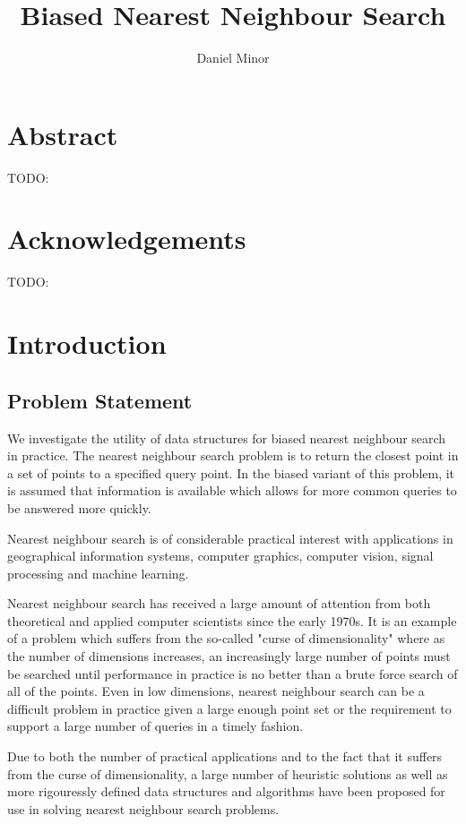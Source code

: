 \documentclass[mcs]{scsthesis}
\title {Biased Nearest Neighbour Search}
\author {Daniel Minor}
\begin{document}
\newtheorem*{thm}{Theorem}[section]

\beforepreface

\prefacesection

\chapter*{Abstract}

TODO:

\chapter*{Acknowledgements}

TODO:

\afterpreface

\chapter{Introduction}

\section{Problem Statement}

We investigate the utility of data structures for biased nearest neighbour
search in practice. The nearest neighbour search problem is to return the
closest point in a set of points to a specified query point. In the biased 
variant of this problem, it is assumed that information is available which
allows for more common queries to be answered more quickly.

Nearest neighbour search is of considerable practical interest with
applications in geographical information systems, computer graphics,
computer vision, signal processing and machine learning.

Nearest neighbour search has received a large amount of attention from both
theoretical and applied computer scientists since the early 1970s. It is an
example of a problem which suffers from the so-called "curse of
dimensionality" where as the number of dimensions increases, an increasingly
large number of points must be searched until performance in practice is no
better than a brute force search of all of the points. Even in low dimensions,
nearest neighbour search can be a difficult problem in practice given a large
enough point set or the requirement to support a large number of queries in a
timely fashion.

Due to both the number of practical applications and to the fact that it suffers
from the curse of dimensionality, a large number of heuristic solutions as well
as more rigouressly defined data structures and algorithms have been proposed
for use in solving nearest neighbour search problems.
\end{document}
